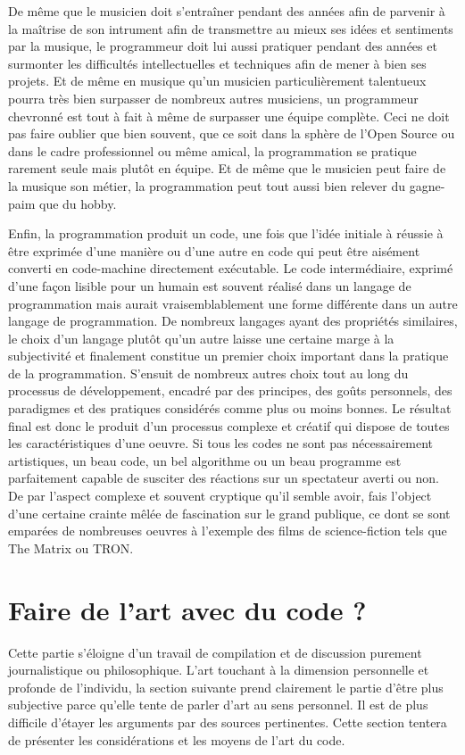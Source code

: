 \documentclass[12pt]{article} %
\begin{document}
De même que le musicien doit s'entraîner pendant des années afin de parvenir à la maîtrise de son intrument afin de transmettre au mieux ses idées et sentiments par la musique, le programmeur doit lui aussi pratiquer pendant des années et surmonter les difficultés intellectuelles et techniques afin de mener à bien ses projets. Et de même en musique qu'un musicien particulièrement talentueux pourra très bien surpasser de nombreux autres musiciens, un programmeur chevronné est tout à fait à même de surpasser une équipe complète. Ceci ne doit pas faire oublier que bien souvent, que ce soit dans la sphère de l'Open Source ou dans le cadre professionnel ou même amical, la programmation se pratique rarement seule mais plutôt en équipe. Et de même que le musicien peut faire de la musique son métier, la programmation peut tout aussi bien relever du gagne-paim que du hobby. 

Enfin, la programmation produit un code, une fois que l'idée initiale à réussie à être exprimée d'une manière ou d'une autre en code qui peut être aisément converti en code-machine directement exécutable. Le code intermédiaire, exprimé d'une façon lisible pour un humain est souvent réalisé dans un langage de programmation mais aurait vraisemblablement une forme différente dans un autre langage de programmation. De nombreux langages ayant des propriétés similaires, le choix d'un langage plutôt qu'un autre laisse une certaine marge à la subjectivité et finalement constitue un premier choix important dans la pratique de la programmation. S'ensuit de nombreux autres choix tout au long du processus de développement, encadré par des principes, des goûts personnels, des paradigmes et des pratiques considérés comme plus ou moins bonnes. Le résultat final est donc le produit d'un processus complexe et créatif qui dispose de toutes les caractéristiques d'une oeuvre. Si tous les codes ne sont pas nécessairement artistiques, un beau code, un bel algorithme ou un beau programme est parfaitement capable de susciter des réactions sur un spectateur averti ou non. De par l'aspect complexe et souvent cryptique qu'il semble avoir, fais l'object d'une certaine crainte mêlée de fascination sur le grand publique, ce dont se sont emparées de nombreuses oeuvres à l'exemple des films de science-fiction tels que The Matrix ou TRON.

\section{Faire de l'art avec du code ?}
Cette partie s'éloigne d'un travail de compilation et de discussion purement journalistique ou philosophique. L'art touchant à la dimension personnelle et profonde de l'individu, la section suivante prend clairement le partie d'être plus subjective parce qu'elle tente de parler d'art au sens personnel. Il est de plus difficile d'étayer les arguments par des sources pertinentes. Cette section tentera de présenter les considérations et les moyens de l'art du code. 
\end{document}
